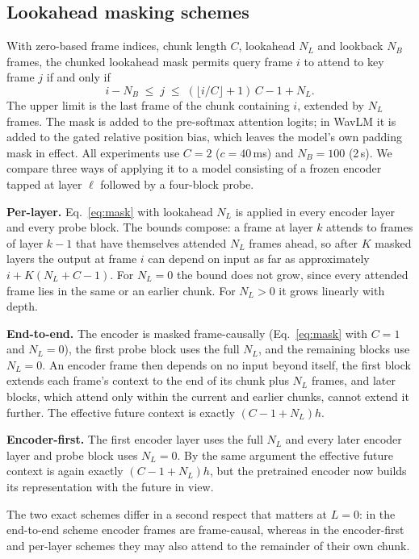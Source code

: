 \documentclass[preprint,12pt,authoryear]{elsarticle}
\begin{document}
\subsection{Lookahead masking schemes}
\label{sec:mask}

With zero-based frame indices, chunk length $C$, lookahead $N_L$ and lookback
$N_B$ frames, the chunked lookahead mask permits query frame $i$ to attend to
key frame $j$ if and only if
\begin{equation}
i - N_B \;\le\; j \;\le\; (\lfloor i/C \rfloor + 1)\,C - 1 + N_L .
\label{eq:mask}
\end{equation}
The upper limit is the last frame of the chunk containing $i$, extended by
$N_L$ frames. The mask is added to the pre-softmax attention logits; in WavLM
it is added to the gated relative position bias, which leaves the model's own
padding mask in effect. All experiments use $C=2$ ($c=40$\,ms) and $N_B=100$
(2\,s). We compare three ways of applying it to a model consisting of a
frozen encoder tapped at layer $\ell$ followed by a four-block probe.

\textbf{Per-layer.} Eq.~\ref{eq:mask} with lookahead $N_L$ is applied in every
encoder layer and every probe block. The bounds compose: a frame at layer $k$
attends to frames of layer $k{-}1$ that have themselves attended $N_L$ frames
ahead, so after $K$ masked layers the output at frame $i$ can depend on input
as far as approximately $i + K(N_L + C - 1)$. For $N_L=0$ the bound does not
grow, since every attended frame lies in the same or an earlier chunk. For
$N_L>0$ it grows linearly with depth.

\textbf{End-to-end.} The encoder is masked frame-causally (Eq.~\ref{eq:mask}
with $C=1$ and $N_L=0$), the first probe block uses the full $N_L$, and the
remaining blocks use $N_L=0$. An encoder frame then depends on no input
beyond itself, the first block extends each frame's context to the end of its
chunk plus $N_L$ frames, and later blocks, which attend only within the
current and earlier chunks, cannot extend it further. The effective future
context is exactly $(C-1+N_L)h$.

\textbf{Encoder-first.} The first encoder layer uses the full $N_L$ and every
later encoder layer and probe block uses $N_L=0$. By the same argument the
effective future context is again exactly $(C-1+N_L)h$, but the pretrained
encoder now builds its representation with the future in view.

The two exact schemes differ in a second respect that matters at $L=0$: in
the end-to-end scheme encoder frames are frame-causal, whereas in the
encoder-first and per-layer schemes they may also attend to the remainder of
their own chunk.
\end{document}

